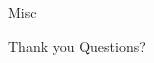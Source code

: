 \documentclass[notes, xcolor = dvipsnames]{beamer}
\begin{document}
    \begin{frame}{Misc}


        


    \end{frame}

    \begin{frame}{Thank you}
        Questions?
    \end{frame}
\end{document}
